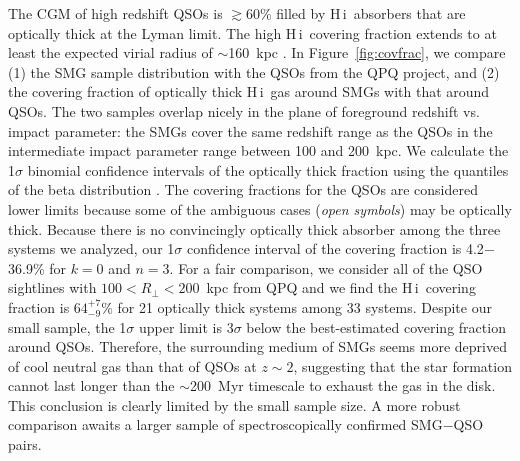 \documentclass[iop,revtex4,twocolumn,apj,numberedappendix,appendixfloats]{emulateapj}
\newcommand{\HI}{H\,{\sc i}}
\newcommand{\sqps}{SMG$-$QSO pairs}
\begin{document}
The CGM of high redshift QSOs is $\gtrsim$60\% filled by \HI\ absorbers that are optically thick at the Lyman limit. The high \HI\ covering fraction extends to at least the expected virial radius of $\sim$160~kpc \citep[][]{Hennawi06,Prochaska13,Prochaska13a}. In Figure~\ref{fig:covfrac}, we compare (1) the SMG sample distribution with the QSOs from the QPQ project, and (2) the covering fraction of optically thick \HI\ gas around SMGs with that around QSOs. The two samples overlap nicely in the plane of foreground redshift vs. impact parameter: the SMGs cover the same redshift range as the QSOs in the intermediate impact parameter range between 100 and 200~kpc. We calculate the 1$\sigma$ binomial confidence intervals of the optically thick fraction using the quantiles of the beta distribution \citep{Cameron11}. The covering fractions for the QSOs are considered lower limits because some of the ambiguous cases ({\it open symbols}) may be optically thick.
Because there is no convincingly optically thick absorber among the three systems we analyzed, our 1$\sigma$ confidence interval of the covering fraction is 4.2$-$36.9\% for $k = 0$ and $n = 3$.
For a fair comparison, we consider all of the QSO sightlines with $100 < R_\bot < 200$~kpc from QPQ and we find the \HI\ covering fraction is $64^{+7}_{-9}$\% for 21 optically thick systems among 33 systems. Despite our small sample, the 1$\sigma$ upper limit is 3$\sigma$ below the best-estimated covering fraction around QSOs. Therefore, the surrounding medium of SMGs seems more deprived of cool neutral
gas than that of QSOs at $z \sim 2$, suggesting that the star formation cannot last longer than the $\sim$200~Myr timescale to exhaust the gas in the disk. This conclusion is clearly limited by the small sample size. A more robust comparison awaits a larger sample of spectroscopically confirmed \sqps.
\end{document}
